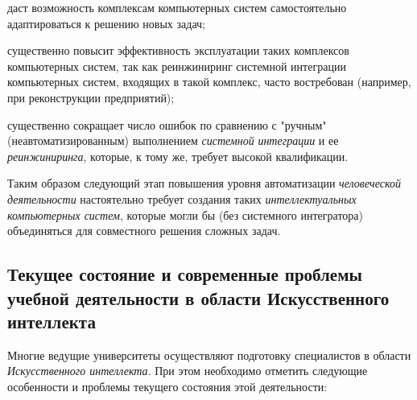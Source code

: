 \begin{textitemize}
	\item
	даст возможность комплексам компьютерных систем самостоятельно адаптироваться к решению новых задач;
	\item
	существенно повысит эффективность эксплуатации таких комплексов компьютерных систем, так как реинжиниринг системной интеграции компьютерных систем, входящих в такой комплекс, часто востребован (например, при реконструкции предприятий);
	\item
	существенно сокращает число ошибок по сравнению с "ручным"{} (неавтоматизированным) выполнением \textit{системной} \textit{интеграции} и ее \textit{реинжиниринга}, которые, к тому же, требует высокой квалификации.
\end{textitemize}

Таким образом следующий этап повышения уровня автоматизации \textit{человеческой деятельности} настоятельно требует создания таких \textit{интеллектуальных компьютерных систем}, которые могли бы  (без системного интегратора) объединяться для совместного решения сложных задач.

\subsection{Текущее состояние и современные проблемы учебной деятельности в области Искусственного интеллекта}
\label{subsec_current_state_and_modern_problems_educational_activity}

Многие ведущие университеты осуществляют подготовку специалистов в области \textit{Искусственного интеллекта}. При этом необходимо отметить следующие особенности и проблемы текущего состояния этой деятельности:

